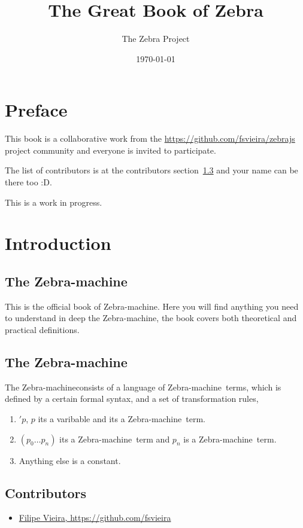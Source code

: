 \documentclass[11pt,a4paper]{report}
\newcommand{\zsystem}{Zebra-machine}
\begin{document}
\title{The Great Book of Zebra}
\author{The Zebra Project}
\date{\today}
\maketitle

\chapter*{Preface}

This book is a collaborative work from the \href{zebrajs}{https://github.com/fsvieira/zebrajs} project community 
and everyone is invited to participate.

The list of contributors is at the contributors section~\ref{sec:contributors} and your name can be there too :D.

This is a work in progress.

\chapter{Introduction}

\section{The \zsystem}

This is the official book of \zsystem. Here you will find anything you need to understand in deep the \zsystem , 
the book covers both theoretical and practical definitions. 

\section{The \zsystem}

The \zsystem consists of a language of \zsystem\ terms, which is defined by a certain formal syntax, and a set of transformation rules,

\begin{enumerate}
\item $'p$, $p$ its a varibable and its a \zsystem\ term.
\item $(p_{0} \ldots p_{n})$ its a \zsystem\ term and $p_{n}$ is a \zsystem\ term.
\item Anything else is a constant.
\end{enumerate}


\section{Contributors}
\label{sec:contributors}

\begin{itemize}
    \item \href{https://github.com/fsvieira}{Filipe Vieira, https://github.com/fsvieira}
\end{itemize}
\end{document}
